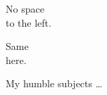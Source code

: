 \begin{correct}
No space\\to the left.
\end{correct}
Same\\here.

\begin{king}
My humble subjects \ldots
\end{king}